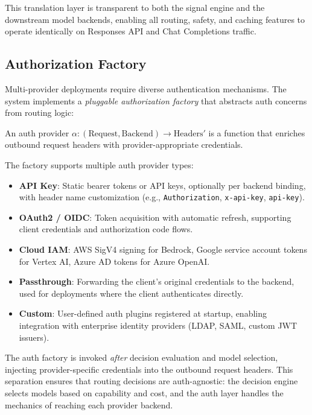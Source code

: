 This translation layer is transparent to both the signal engine and the downstream model backends, enabling all routing, safety, and caching features to operate identically on Responses API and Chat Completions traffic.

\subsection{Authorization Factory}
\label{subsec:authz_factory}

Multi-provider deployments require diverse authentication mechanisms.
The system implements a \emph{pluggable authorization factory} that abstracts auth concerns from routing logic:

\begin{definition}
An auth provider $\alpha: (\text{Request}, \text{Backend}) \to \text{Headers}'$ is a function that enriches outbound request headers with provider-appropriate credentials.
\end{definition}

The factory supports multiple auth provider types:

\begin{itemize}[leftmargin=*]
  \item \textbf{API Key}: Static bearer tokens or API keys, optionally per backend binding, with header name customization (e.g., \texttt{Authorization}, \texttt{x-api-key}, \texttt{api-key}).
  \item \textbf{OAuth2 / OIDC}: Token acquisition with automatic refresh, supporting client credentials and authorization code flows.
  \item \textbf{Cloud IAM}: AWS SigV4 signing for Bedrock, Google service account tokens for Vertex AI, Azure AD tokens for Azure OpenAI.
  \item \textbf{Passthrough}: Forwarding the client's original credentials to the backend, used for deployments where the client authenticates directly.
  \item \textbf{Custom}: User-defined auth plugins registered at startup, enabling integration with enterprise identity providers (LDAP, SAML, custom JWT issuers).
\end{itemize}

The auth factory is invoked \emph{after} decision evaluation and model selection, injecting provider-specific credentials into the outbound request headers.
This separation ensures that routing decisions are auth-agnostic: the decision engine selects models based on capability and cost, and the auth layer handles the mechanics of reaching each provider backend.

